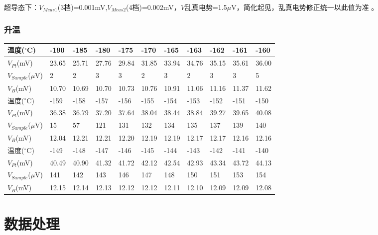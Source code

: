\documentclass[UTF8]{ctexart}
\begin{document}
    超导态下：$V_{Meas1}$(3档)=0.001mV,$V_{Meas2}$(4档)=0.002mV，$V$乱真电势=1.5$\mu$V，简化起见，乱真电势修正统一以此值为准 。

    \subsubsection{升温}

    \begin{table}[H]
        \centering
        \begin{tabular}{|l|l|l|l|l|l|l|l|l|l|l|}
        \hline
            温度($^{\circ}$C) & -190 & -185 & -180 & -175 & -170 & -165 & -163 & -162 & -161 & -160 \\ \hline
            $V_{Pt}$(mV) & 23.65 & 25.71 & 27.76 & 29.84 & 31.85 & 33.94 & 34.76 & 35.15 & 35.61 & 36.00 \\ \hline
            $V_{Sample}$($\mu$V) & 2 & 2 & 3 & 3 & 2 & 3 & 2 & 3 & 3 & 5 \\ \hline
            $V_B$(mV) & 10.70 & 10.69 & 10.70 & 10.73 & 10.76 & 10.91 & 11.06 & 11.16 & 11.37 & 11.62 \\ \hline
            \hline
            温度($^{\circ}$C) & -159 & -158 & -157 & -156 & -155 & -154 & -153 & -152 & -151 & -150 \\ \hline
            $V_{Pt}$(mV) & 36.38 & 36.79 & 37.20 & 37.64 & 38.04 & 38.44 & 38.84 & 39.27 & 39.65 & 40.08 \\ \hline
            $V_{Sample}$($\mu$V) & 15 & 57 & 121 & 131 & 132 & 134 & 135 & 137 & 139 & 140 \\ \hline
            $V_B$(mV) & 12.04 & 12.21 & 12.21 & 12.20 & 12.19 & 12.19 & 12.17 & 12.17 & 12.16 & 12.16 \\ \hline
            \hline
            温度($^{\circ}$C) & -149 & -148 & -147 & -146 & -145 & -144 & -143 & -142 & -141 & -140 \\ \hline
            $V_{Pt}$(mV) & 40.49 & 40.90 & 41.32 & 41.72 & 42.12 & 42.54 & 42.93 & 43.34 & 43.72 & 44.13 \\ \hline
            $V_{Sample}$($\mu$V) & 141 & 142 & 143 & 146 & 147 & 148 & 150 & 151 & 153 & 154 \\ \hline
            $V_B$(mV) & 12.15 & 12.14 & 12.13 & 12.12 & 12.12 & 12.11 & 12.10 & 12.09 & 12.09 & 12.08 \\ \hline
        \end{tabular}
    \end{table}

\section{数据处理}
\end{document}
